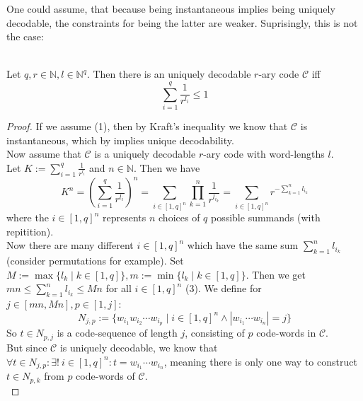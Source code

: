 \documentclass[12pt]{article}
\newenvironment{statement3}[3]{\begin{trivlist}
\item[\hskip \labelsep {\bfseries #1}\hskip \labelsep {\bfseries #2} {#3}\textbf{.}]}{\end{trivlist}}
\begin{document}
One could assume, that because being instantaneous implies being uniquely decodable, the constraints
for being the latter are weaker. Suprisingly, this is not the case:

\begin{statement3}{(1.7)}{Theorem}{(McMillan's Inequality)}\strut\\[2pt]
    Let $q,r \in \mathbb{N}, l \in \mathbb{N}^q$. Then there is an uniquely decodable
    $r$-ary code $\mathcal{C}$ iff
    \begin{equation}
        \sum_{i=1}^{q} \frac{1}{r^{l_i}} \leq 1 \tag{1}
    \end{equation}

    \begin{proof}
        If we assume (1), then by Kraft's inequality we know that $\mathcal{C}$
        is instantaneous, which by \cite{ICT} implies unique decodability.\\[10pt]
        Now assume that $\mathcal{C}$ is a uniquely decodable $r$-ary code with word-lengths
        $l$.\\
        Let
        $
            K := \sum_{i=1}^{q} \frac{1}{r^{l_i}}
        $ and $n \in \mathbb{N}$.
        Then we have
        \begin{equation}
            K^n
            = \left(\sum_{i=1}^{q} \frac{1}{r^{l_i}}\right)^n
            = \sum_{i \in [1,q]^n}\prod_{k=1}^{n} \frac{1}{r^{l_{i_k}}}
            = \sum_{i \in [1,q]^n} r^{-\sum_{k=1}^{n} l_{i_k}} \tag{2}
        \end{equation}
        where the $i \in [1,q]^n$ represents $n$ choices of $q$ possible summands (with repitition).\\[10pt]
        Now there are many different $i \in [1,q]^n$ which have the same sum $\sum_{k=1}^{n} l_{i_k}$
        (consider permutations for example). Set $M := \max\{l_k\mid k \in [1,q]\}, m := \min\{l_k \mid k \in [1,q]\}$.
        Then we get $mn \leq \sum_{k=1}^{n} l_{i_k} \leq Mn$ for all $i \in [1,q]^n$ (3). We define for
        $j \in [mn,Mn], p \in [1,j]$:
        $$
            N_{j,p} := \{w_{i_1}w_{i_2}\cdots w_{i_p} \mid i \in [1,q]^n \land |w_{i_1}\cdots w_{i_n}| = j \}
        $$
        So $t \in N_{p,j}$ is a code-sequence of length $j$, consisting of $p$ code-words in $\mathcal{C}$.\\
        But since $\mathcal{C}$ is uniquely decodable, we know that
        $
            \forall t \in N_{j,p}: \exists!\ i \in [1,q]^n: t = w_{i_1}\cdots w_{i_n}
        $,
        meaning there is only one way to construct $t \in N_{p,k}$ from $p$ code-words of $\mathcal{C}$.\\

\end{proof}
\end{statement3}
\end{document}
